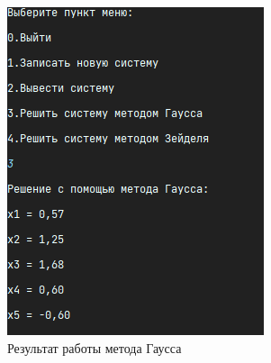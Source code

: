 \documentclass[12pt]{article}
\begin{document}
    \begin{figure}[ht]
        \centering
        \begin{subfigure}{0.4\textwidth}
            \includegraphics[width=\linewidth]{image/gauss_equation}
            \caption{Результат работы метода Гаусса}
        \end{subfigure}
        \hfill
        \begin{subfigure}{0.4\textwidth}

\end{subfigure}
\end{figure}
\end{document}
